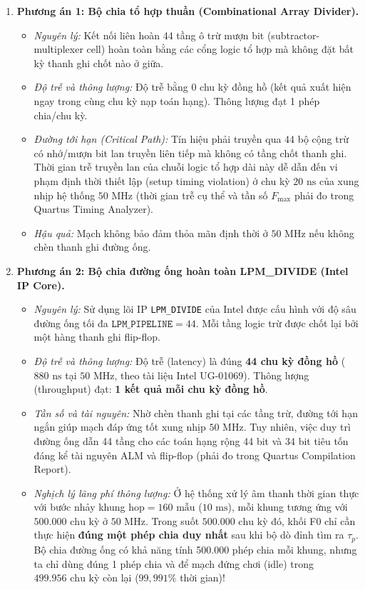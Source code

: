 \begin{enumerate}[leftmargin=1.5em, itemsep=4pt]
    \item \textbf{Phương án 1: Bộ chia tổ hợp thuần (Combinational Array Divider).}
    \begin{itemize}[leftmargin=1.2em, itemsep=2pt]
        \item \emph{Nguyên lý:} Kết nối liên hoàn 44 tầng ô trừ mượn bit (subtractor-multiplexer cell) hoàn toàn bằng các cổng logic tổ hợp mà không đặt bất kỳ thanh ghi chốt nào ở giữa.
        \item \emph{Độ trễ và thông lượng:} Độ trễ bằng 0 chu kỳ đồng hồ (kết quả xuất hiện ngay trong cùng chu kỳ nạp toán hạng). Thông lượng đạt 1 phép chia/chu kỳ.
        \item \emph{Đường tới hạn (Critical Path):} Tín hiệu phải truyền qua 44 bộ cộng trừ có nhớ/mượn bit lan truyền liên tiếp mà không có tầng chốt thanh ghi. Thời gian trễ truyền lan của chuỗi logic tổ hợp dài này dễ dẫn đến vi phạm định thời thiết lập (setup timing violation) ở chu kỳ $20\text{ ns}$ của xung nhịp hệ thống $50\text{ MHz}$ (thời gian trễ cụ thể và tần số $F_{\max}$ phải đo trong Quartus Timing Analyzer).
        \item \emph{Hậu quả:} Mạch không bảo đảm thỏa mãn định thời ở $50\text{ MHz}$ nếu không chèn thanh ghi đường ống.
    \end{itemize}

    \item \textbf{Phương án 2: Bộ chia đường ống hoàn toàn LPM\_DIVIDE (Intel IP Core).}
    \begin{itemize}[leftmargin=1.2em, itemsep=2pt]
        \item \emph{Nguyên lý:} Sử dụng lõi IP \texttt{LPM\_DIVIDE} của Intel được cấu hình với độ sâu đường ống tối đa $\texttt{LPM\_PIPELINE} = 44$. Mỗi tầng logic trừ được chốt lại bởi một hàng thanh ghi flip-flop.
        \item \emph{Độ trễ và thông lượng:} Độ trễ (latency) là đúng \textbf{44 chu kỳ đồng hồ} ($880\text{ ns}$ tại $50\text{ MHz}$, theo tài liệu Intel UG-01069). Thông lượng (throughput) đạt: \textbf{1 kết quả mỗi chu kỳ đồng hồ}.
        \item \emph{Tần số và tài nguyên:} Nhờ chèn thanh ghi tại các tầng trừ, đường tới hạn ngắn giúp mạch đáp ứng tốt xung nhịp $50\text{ MHz}$. Tuy nhiên, việc duy trì đường ống dẫn 44 tầng cho các toán hạng rộng 44 bit và 34 bit tiêu tốn đáng kể tài nguyên ALM và flip-flop (phải đo trong Quartus Compilation Report).
        \item \emph{Nghịch lý lãng phí thông lượng:} Ở hệ thống xử lý âm thanh thời gian thực với bước nhảy khung $\text{hop} = 160\text{ mẫu}$ ($10\text{ ms}$), mỗi khung tương ứng với $500.000\text{ chu kỳ}$ ở $50\text{ MHz}$. Trong suốt $500.000\text{ chu kỳ}$ đó, khối F0 chỉ cần thực hiện \textbf{đúng một phép chia duy nhất} sau khi bộ dò đỉnh tìm ra $\tau_p$. Bộ chia đường ống có khả năng tính 500.000 phép chia mỗi khung, nhưng ta chỉ dùng đúng 1 phép chia và để mạch đứng chơi (idle) trong $499.956\text{ chu kỳ}$ còn lại ($99{,}991\%$ thời gian)!
    \end{itemize}


\end{enumerate}
